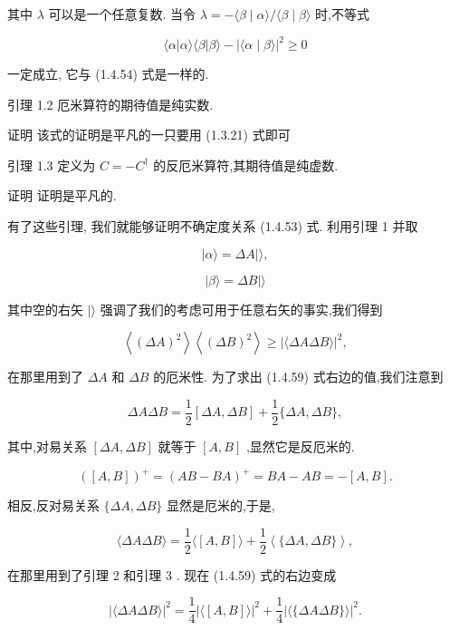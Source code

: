 \documentclass[lang=cn,newtx,10pt,scheme=chinese,thmcnt=section]{elegantbook}
\begin{document}
其中 $\lambda$ 可以是一个任意复数. 当令 $\lambda = - \langle \beta \mid \alpha \rangle /\langle \beta \mid \beta \rangle$ 时,不等式

$$
\langle \alpha \left| {\alpha \rangle \langle \beta }\right| \beta \rangle - {\left| \langle \alpha \mid \beta \rangle \right| }^{2} \geq 0 \tag{1. 4.57}
$$

一定成立, 它与 (1.4.54) 式是一样的.

引理 1.2 厄米算符的期待值是纯实数.

证明 该式的证明是平凡的一只要用 (1.3.21) 式即可

引理 1.3 定义为 $C = - {C}^{ \dagger }$ 的反厄米算符,其期待值是纯虚数.

证明 证明是平凡的.

有了这些引理, 我们就能够证明不确定度关系 (1.4.53) 式. 利用引理 1 并取

$$
\left| {\alpha \rangle = {\Delta A}}\right| \rangle ,
$$

$$
\left| {\beta \rangle = {\Delta B}}\right| \rangle \tag{1. 4.58}
$$

其中空的右矢 $|\rangle$ 强调了我们的考虑可用于任意右矢的事实,我们得到

$$
\left\langle {\left( \Delta A\right) }^{2}\right\rangle \left\langle {\left( \Delta B\right) }^{2}\right\rangle \geq {\left| \langle \Delta A\Delta B\rangle \right| }^{2}, \tag{1. 4.59}
$$

在那里用到了 ${\Delta A}$ 和 ${\Delta B}$ 的厄米性. 为了求出 (1.4.59) 式右边的值,我们注意到

$$
{\Delta A\Delta B} = \frac{1}{2}\left\lbrack {{\Delta A},{\Delta B}}\right\rbrack + \frac{1}{2}\{ {\Delta A},{\Delta B}\} , \tag{1. 4.60}
$$

其中,对易关系 $\left\lbrack {{\Delta A},{\Delta B}}\right\rbrack$ 就等于 $\left\lbrack {A, B}\right\rbrack$ ,显然它是反厄米的.

$$
{\left( \left\lbrack A, B\right\rbrack \right) }^{ + } = {\left( AB - BA\right) }^{ + } = {BA} - {AB} = - \left\lbrack {A, B}\right\rbrack . \tag{1. 4.61}
$$

相反,反对易关系 $\{ {\Delta A},{\Delta B}\}$ 显然是厄米的,于是,

$$
\langle {\Delta A\Delta B}\rangle = \frac{1}{2}\langle \left\lbrack {A, B}\right\rbrack \rangle + \frac{1}{2}\left\langle {\{ {\Delta A},{\Delta B}\} }\right\rangle , \tag{1. 4.62}
$$

在那里用到了引理 2 和引理 3 . 现在 (1.4.59) 式的右边变成

$$
{\left| \langle \Delta A\Delta B\rangle \right| }^{2} = \frac{1}{4}{\left| \langle \left\lbrack A, B\right\rbrack \rangle \right| }^{2} + \frac{1}{4}{\left| \langle \{ \Delta A\Delta B\} \rangle \right| }^{2}. \tag{1. 4.63}
$$
\end{document}
